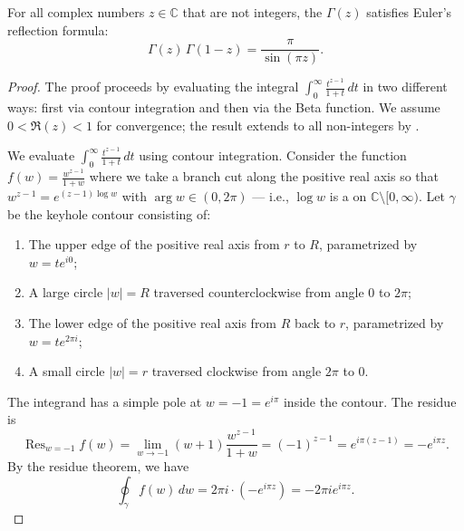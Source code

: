 \begin{proposition} \label{proposition:eulers_reflection_formula_for_gamma_function}
	For all complex numbers $z \in \mathbb{C}$ that are not integers, the  $\Gamma(z)$ satisfies Euler's reflection formula:
	$$
	\boxed{\Gamma(z) \, \Gamma(1 - z) = \frac{\pi}{\sin(\pi z)}.}
	$$

\end{proposition}

\begin{proof}
	The proof proceeds by evaluating the integral $\int_0^\infty \frac{t^{z-1}}{1+t}\,dt$ in two different ways: first via contour integration and then via the Beta function. We assume $0 < \Re(z) < 1$ for convergence; the result extends to all non-integers by .

	We evaluate $\int_0^\infty \frac{t^{z-1}}{1+t}\,dt$ using contour integration. Consider the function $f(w) = \frac{w^{z-1}}{1+w}$ where we take a branch cut along the positive real axis so that $w^{z-1} = e^{(z-1)\log w}$ with $\arg w \in (0, 2\pi)$ — i.e., $\log w$ is a  on $\mathbb{C} \setminus [0, \infty)$. Let $\gamma$ be the keyhole contour consisting of:
	\begin{enumerate}
		\item The upper edge of the positive real axis from $r$ to $R$, parametrized by $w = t e^{i0}$;
		\item A large circle $|w| = R$ traversed counterclockwise from angle $0$ to $2\pi$;
		\item The lower edge of the positive real axis from $R$ back to $r$, parametrized by $w = t e^{2\pi i}$;
		\item A small circle $|w| = r$ traversed clockwise from angle $2\pi$ to $0$.
	\end{enumerate}

	The integrand has a simple pole at $w = -1 = e^{i\pi}$ inside the contour. The residue is
	$$\operatorname{Res}_{w=-1} f(w) = \lim_{w \to -1} (w+1)\frac{w^{z-1}}{1+w} = (-1)^{z-1} = e^{i\pi(z-1)} = -e^{i\pi z}.$$
	By the residue theorem, we have
	$$\oint_\gamma f(w)\,dw = 2\pi i \cdot (-e^{i\pi z}) = -2\pi i e^{i\pi z}.$$


\end{proof}
